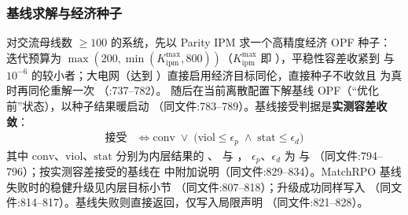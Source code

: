 \subsubsection*{基线求解与经济种子}
对交流母线数 $\ge 100$ 的系统，先以 Parity IPM 求一个高精度经济 OPF 种子：
迭代预算为 $\max(200,\min(K_{\mathrm{ipm}}^{\max},800))$（$K_{\mathrm{ipm}}^{\max}$
即 ），平稳性容差收紧到  与
$10^{-6}$ 的较小者；大电网（达到
）直接启用经济目标同伦，直接种子不收敛且
 为真时再同伦重解一次
（:737--782）。
随后在当前离散配置下解基线 OPF（“优化前”状态），以种子结果暖启动
（同文件:783--789）。基线接受判据是\textbf{实测容差收敛}：
\begin{align*}
\text{接受} &\iff \mathrm{conv}\;\lor\;
  \bigl(\mathrm{viol}\le\epsilon_p\;\land\;\mathrm{stat}\le\epsilon_d\bigr)
\end{align*}
其中 $\mathrm{conv}$、$\mathrm{viol}$、$\mathrm{stat}$ 分别为内层结果的
、 与 ，
$\epsilon_p$、$\epsilon_d$ 为  与
（同文件:794--796）；按实测容差接受的基线在
 中附加说明（同文件:829--834）。MatchRPO 基线失败时的稳健升级见内层目标小节
（同文件:807--818）；升级成功同样写入 
（同文件:814--817）。基线失败则直接返回，仅写入局限声明
（同文件:821--828）。

